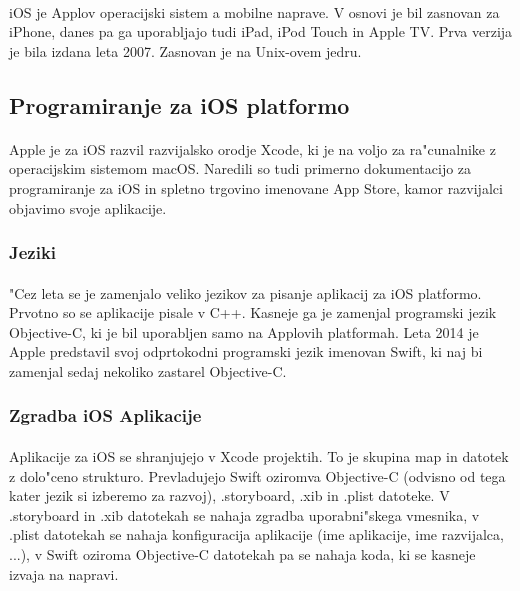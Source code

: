 \paragraph{}iOS\cite{ios-wiki} je Applov operacijski sistem a mobilne naprave. V osnovi je bil zasnovan za iPhone, danes pa ga uporabljajo tudi iPad, iPod Touch in Apple TV. Prva verzija je bila izdana leta 2007. Zasnovan je na Unix-ovem\cite{unix-wiki} jedru.

\subsection{Programiranje za iOS platformo}
\paragraph{}Apple je za iOS razvil razvijalsko orodje Xcode\cite{xcode-wiki}, ki je na voljo za ra"cunalnike z operacijskim sistemom macOS. Naredili so tudi primerno dokumentacijo\cite{ios-docs} za programiranje za iOS in spletno trgovino imenovane App Store\cite{app_store-wiki}, kamor razvijalci objavimo svoje aplikacije.

\subsubsection{Jeziki}
\paragraph{}"Cez leta se je zamenjalo veliko jezikov za pisanje aplikacij za iOS platformo. Prvotno so se aplikacije pisale v C++\cite{cpp-wiki}. Kasneje ga je zamenjal programski jezik Objective-C\cite{objective-c-wiki}, ki je bil uporabljen samo na Applovih platformah. Leta 2014 je Apple predstavil svoj odprtokodni programski jezik imenovan Swift\cite{swift-wiki}, ki naj bi zamenjal sedaj nekoliko zastarel Objective-C\cite{objective-c-wiki}.

\subsubsection{Zgradba iOS Aplikacije}
\paragraph{}Aplikacije za iOS se shranjujejo v Xcode projektih. To je skupina map in datotek z dolo"ceno strukturo. Prevladujejo Swift oziromva Objective-C (odvisno od tega kater jezik si izberemo za razvoj), .storyboard, .xib in .plist datoteke. V .storyboard in .xib datotekah se nahaja zgradba uporabni"skega vmesnika, v .plist datotekah se nahaja konfiguracija aplikacije (ime aplikacije, ime razvijalca, ...), v Swift oziroma Objective-C datotekah pa se nahaja koda, ki se kasneje izvaja na napravi.	

